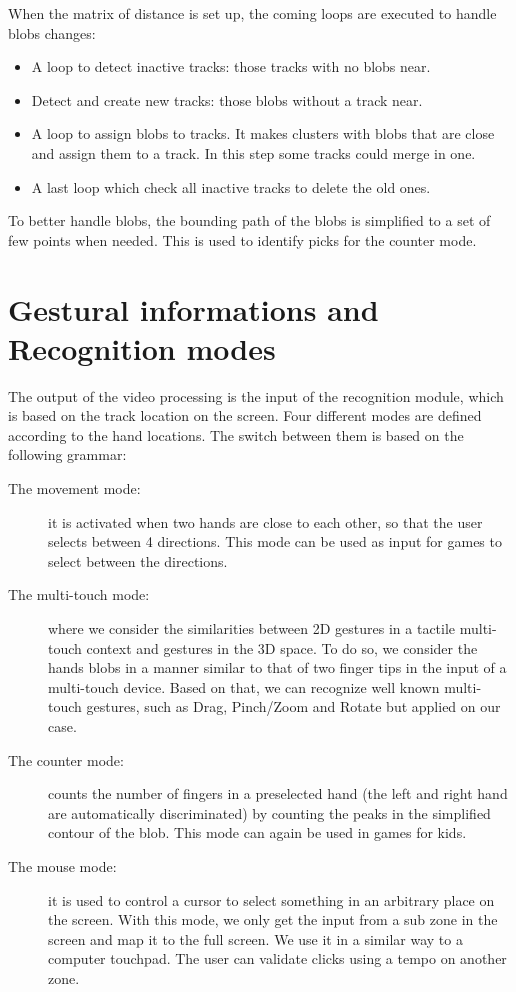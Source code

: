 \documentclass{llncs}
\begin{document}
When the matrix of distance is set up, the coming loops
are executed to handle blobs changes:
\begin{itemize}
 \item A loop to detect inactive tracks: those tracks with no blobs near.
 \item Detect and create new tracks: those blobs without a track near.
 \item A loop to assign blobs to tracks. It makes clusters with blobs that are close and assign them to a track.
In this step some tracks could merge in one.
 \item A last loop which check all inactive tracks to delete the old ones.
\end{itemize}

To better handle blobs, the bounding path of the blobs
is simplified to a set of few points when needed.
This is used to identify picks for the counter mode.

\section{Gestural informations and Recognition modes}
The output of the video processing is the input of the recognition module,
which is based on the track location on the screen.
Four different modes are defined according to the hand locations. The switch between them is based on the following grammar:
\begin{description}
 \item[The movement mode:] it is activated when two hands are close to each other, so that the user selects between 4 directions. This mode can be used as input for games to select between the directions.
 \item[The multi-touch mode:] where we consider the similarities between 2D gestures in a tactile multi-touch context and gestures in the 3D space. To do so, we consider the hands blobs in a manner similar to that of two finger tips in the input of a multi-touch device. Based on that, we can recognize well known multi-touch gestures, such as Drag, Pinch/Zoom and Rotate but applied on our case.
 \item[The counter mode:] counts the number of fingers in a preselected hand (the left and right hand are automatically discriminated) by counting the peaks in the simplified contour of the blob. This mode can again be used in games for kids.
 \item[The mouse mode:] it is used to control a cursor to select something in an arbitrary place on the screen. With this mode, we only get the input from a sub zone in the screen and map it to the full screen. We use it in a similar way to a computer touchpad.
The user can validate clicks using a tempo on another zone.
\end{description}
\end{document}

